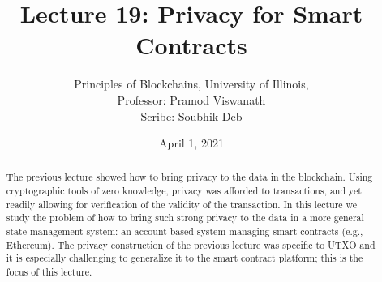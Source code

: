 \documentclass{article}
\title{Lecture 19: Privacy for Smart Contracts}
\author{Principles of Blockchains, University of Illinois,  \\ Professor:  Pramod Viswanath \\ Scribe:  Soubhik Deb}
\date{April 1, 2021}
\begin{document}
\maketitle

\begin{abstract}
The previous lecture showed how to bring  privacy to the data in the blockchain. Using cryptographic tools of zero knowledge, privacy was afforded to transactions, and yet readily allowing for verification of the validity of the transaction. In this lecture we study the problem of how to bring such strong privacy to the data in a more general state management system: an account based system managing smart contracts (e.g., Ethereum).  The privacy construction of the previous lecture was specific to UTXO and it is especially challenging to generalize it to the smart contract platform; this is the  focus of this lecture. 
\end{abstract}







\end{document}
